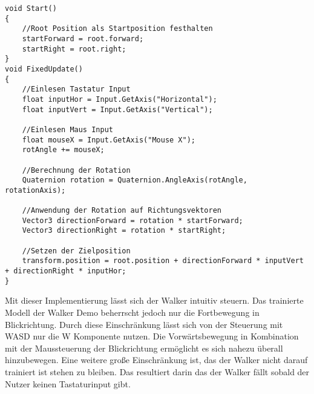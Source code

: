 \begin{lstlisting}[caption={Erweiterung der Nutzersteuerung mit separater Blickrichtung},captionpos=b,label={lst:nutzersteuerung_3}]
void Start()
{
    //Root Position als Startposition festhalten
    startForward = root.forward;
    startRight = root.right;
}
void FixedUpdate()
{
    //Einlesen Tastatur Input
    float inputHor = Input.GetAxis("Horizontal");
    float inputVert = Input.GetAxis("Vertical");

    //Einlesen Maus Input
    float mouseX = Input.GetAxis("Mouse X");
    rotAngle += mouseX;

    //Berechnung der Rotation
    Quaternion rotation = Quaternion.AngleAxis(rotAngle, rotationAxis);

    //Anwendung der Rotation auf Richtungsvektoren
    Vector3 directionForward = rotation * startForward;
    Vector3 directionRight = rotation * startRight;

    //Setzen der Zielposition
    transform.position = root.position + directionForward * inputVert + directionRight * inputHor;
}
\end{lstlisting}

Mit dieser Implementierung lässt sich der Walker intuitiv steuern. Das trainierte Modell der Walker Demo beherrscht jedoch nur die Fortbewegung in Blickrichtung. Durch diese Einschränkung lässt sich von der Steuerung mit WASD nur die W Komponente nutzen. Die Vorwärtsbewegung in Kombination mit der Maussteuerung der Blickrichtung ermöglicht es sich nahezu überall hinzubewegen. Eine weitere große Einschränkung ist, das der Walker nicht darauf trainiert ist stehen zu bleiben. Das resultiert darin das der Walker fällt sobald der Nutzer keinen Tastaturinput gibt.